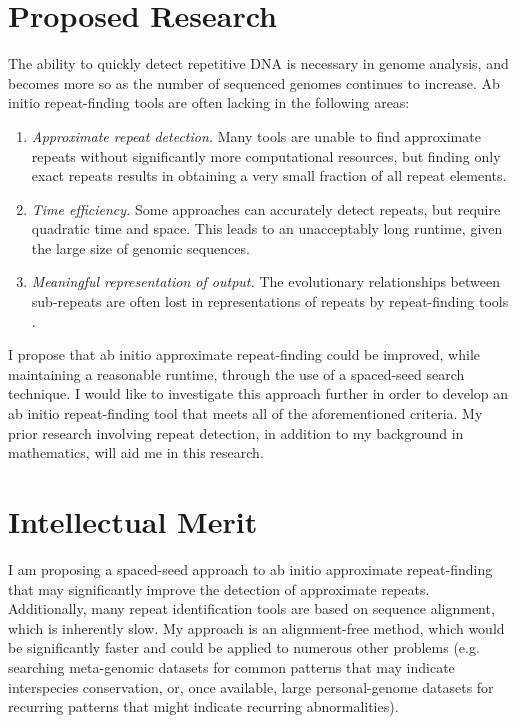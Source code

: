 \documentclass[12pt]{article}
\begin{document}
\section*{Proposed Research}
The ability to quickly detect repetitive DNA is necessary in genome analysis, and becomes more so as the number of sequenced genomes continues to increase.
Ab initio repeat-finding tools are often lacking in the following areas:
\begin{enumerate}
\item{\textit{Approximate repeat detection.} Many tools are unable to find approximate repeats without significantly more computational resources, but  finding only exact repeats results in obtaining a very small fraction of all repeat elements.}
\item{\textit{Time efficiency.} Some approaches can accurately detect repeats, but require quadratic time and space. 
This leads to an unacceptably long runtime, given the large size of genomic sequences.}
\item{\textit{Meaningful representation of output.} The evolutionary relationships between sub-repeats are often lost in representations of repeats by repeat-finding tools \cite{pevzner2004de-novo}. }
\end{enumerate}
I propose that ab initio approximate repeat-finding could be improved, while maintaining a reasonable runtime, through the use of a spaced-seed search technique. 
I would like to investigate this approach further
in order to develop an ab initio repeat-finding tool that meets all of the aforementioned criteria. 
My prior research involving repeat detection, in addition to my background in mathematics, will aid me in this research. 


\section*{Intellectual Merit}
I am proposing a spaced-seed approach to ab initio approximate repeat-finding that may significantly improve the detection of approximate repeats. 
Additionally, many repeat identification tools are based on sequence alignment, which is inherently slow. 
My approach is an alignment-free method, which would be significantly faster 
and could be applied to numerous other problems (e.g. searching meta-genomic datasets for common patterns that may indicate interspecies conservation, or, once available, large personal-genome datasets for recurring patterns that might indicate recurring abnormalities).
\end{document}
